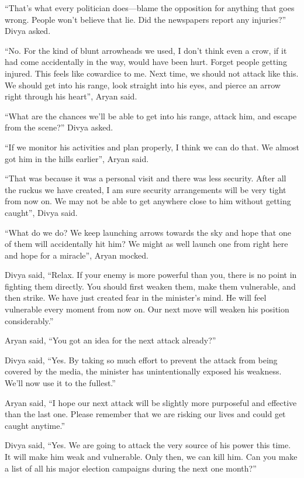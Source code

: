 “That's what every politician does—blame the opposition for anything that goes
wrong. People won't believe that lie. Did the newspapers report any injuries?”
Divya asked.

“No. For the kind of blunt arrowheads we used, I don't think even a crow, if
it had come accidentally in the way, would have been hurt. Forget people getting
injured. This feels like cowardice to me. Next time, we should not attack like
this. We should get into his range, look straight into his eyes, and pierce an
arrow right through his heart”, Aryan said.

“What are the chances we'll be able to get into his range, attack him, and escape
from the scene?” Divya asked.

“If we monitor his activities and plan properly, I think we can do that. We
almost got him in the hills earlier”, Aryan said.

“That was because it was a personal visit and there was less security. After all
the ruckus we have created, I am sure security arrangements will be very tight
from now on. We may not be able to get anywhere close to him without getting
caught”, Divya said.

“What do we do? We keep launching arrows towards the sky and hope that one of
them will accidentally hit him? We might as well launch one from right here and
hope for a miracle”, Aryan mocked.

Divya said, “Relax. If your enemy is more powerful than you, there is no point
in fighting them directly. You should first weaken them, make them vulnerable,
and then strike. We have just created fear in the minister's mind. He will
feel vulnerable every moment from now on. Our next move will weaken his position
considerably.”

Aryan said, “You got an idea for the next attack already?”

Divya said, “Yes. By taking so much effort to prevent the attack from being
covered by the media, the minister has unintentionally exposed his weakness.
We'll now use it to the fullest.”

Aryan said, “I hope our next attack will be slightly more purposeful and
effective than the last one. Please remember that we are risking our lives and
could get caught anytime.”

Divya said, “Yes. We are going to attack the very source of his power this time.
It will make him weak and vulnerable. Only then, we can kill him. Can you make a
list of all his major election campaigns during the next one month?”